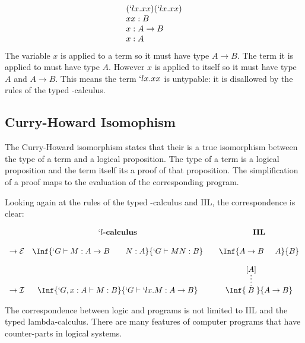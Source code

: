   \begin{example}
  \[  
  \begin{array}{lr}
    (`lx.xx)(`lx.xx) \\
    xx : B \\
    x : A \to B \\
    x : A
  \end{array}
  \]
  The variable $x$ is applied to a term so it must have type $A \to B$.
  The term it is applied to must have type $A$.
  However $x$ is applied to itself so it must have type $A$ and $A \to B$.
  This means the term $`lx.xx$ is untypable:
  it is disallowed by the rules of the typed \lam-calculus.
  \end{example}
 
  \subsection{Curry-Howard Isomophism}
  
  The Curry-Howard isomorphism states that their is a true isomorphism between the type of a term and a logical proposition. 
  The type of a term is a logical proposition and the term itself its a proof of that proposition.
  The simplification of a proof maps to the evaluation of the corresponding program.\cite{Wadler15}
  
  Looking again at the rules of the typed \lam-calculus and IIL,
  the correspondence is clear:
  
  \[
  \begin{array}{cc@{\quad\quad}c}
    & `l\textbf{-calculus} & \textbf{IIL}
    \\
    \\
    \to\mathcal{E} 
    &
    \Inf{ `G \vdash M : A \to B \hspace{20pt} N:A }
        { `G \vdash M N : B }
    &
    \Inf{ A \to B \hspace{0.5cm} A }
        {B}
    \\
    \\
    \to\mathcal{I} 
    &
    \Inf{ `G,x:A \vdash M : B }
      { `G \vdash `lx.M : A \to B }
    &
    \Inf{ \infer*{B}{[A]} }
        { A \to B}
   \\
    \end{array}
  \]
 
  The correspondence between logic and programs is not limited to IIL and the typed lambda-calculus.
  There are many features of computer programs that have counter-parts in logical systems.

